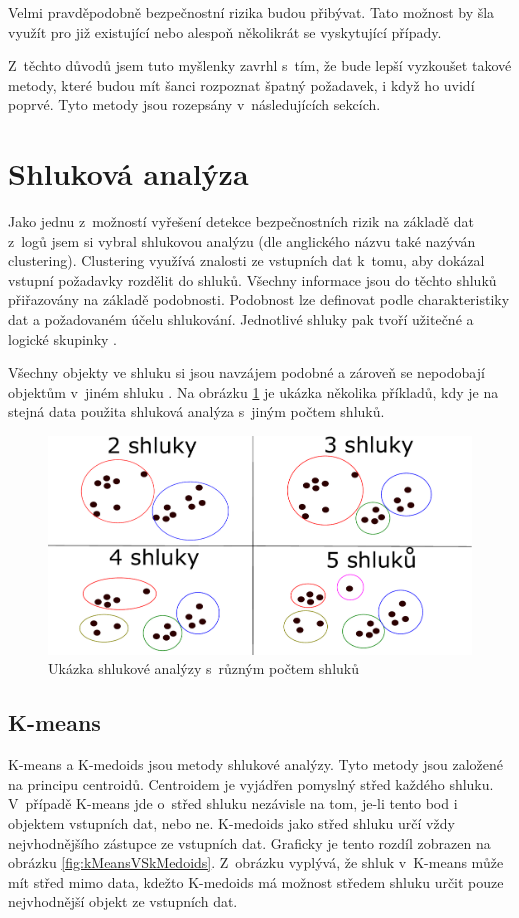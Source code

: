 \documentclass[thesis=M,czech]{FITthesis}[2012/10/20]
\newcommand{\tmpframe}[1]{\fbox{#1}}
\renewcommand{\tmpframe}[1]{#1}
\begin{document}
		Velmi pravděpodobně bezpečnostní rizika budou přibývat. Tato možnost by šla využít pro již existující nebo alespoň několikrát se vyskytující případy.
		
		Z~těchto důvodů jsem tuto myšlenky zavrhl s~tím, že bude lepší vyzkoušet takové metody, které budou mít šanci rozpoznat špatný požadavek, i když ho uvidí poprvé. Tyto metody jsou rozepsány v~následujících sekcích. 		
	
	\section{Shluková analýza}
		Jako jednu z~možností vyřešení detekce bezpečnostních rizik na základě dat z~logů jsem si vybral shlukovou analýzu (dle anglického názvu také nazýván clustering). Clustering využívá znalosti ze vstupních dat k~tomu, aby dokázal vstupní požadavky rozdělit do shluků. Všechny informace jsou do těchto shluků přiřazovány na základě podobnosti. Podobnost lze definovat podle charakteristiky dat a požadovaném účelu shlukování. Jednotlivé shluky pak tvoří užitečné a logické skupinky .
		
		Všechny objekty ve shluku si jsou navzájem podobné a zároveň se nepodobají objektům v~jiném shluku \cite{IntroductionToDataMining}. Na obrázku \ref{fig:clustering} je ukázka několika příkladů, kdy je na stejná data použita shluková analýza s~jiným počtem shluků.
		
		\begin{figure}[htb]\centering
			\tmpframe{\includegraphics[width=\textwidth]{./img/shlukova_anal}}		
			\caption{Ukázka shlukové analýzy s~různým počtem shluků}
			\label{fig:clustering}
		\end{figure}
		
		\subsection{K-means}
			K-means a K-medoids jsou metody shlukové analýzy. Tyto metody jsou založené na principu centroidů. Centroidem je vyjádřen pomyslný střed každého shluku. V~případě K-means jde o~střed shluku nezávisle na tom, je-li tento bod i objektem vstupních dat, nebo ne. K-medoids jako střed shluku určí vždy nejvhodnějšího zástupce ze vstupních dat. Graficky je tento rozdíl zobrazen na obrázku \ref{fig:kMeansVSkMedoids}. Z~obrázku vyplývá, že shluk v~K-means může mít střed mimo data, kdežto K-medoids má možnost středem shluku určit pouze nejvhodnější objekt ze vstupních dat.
			
\end{document}
